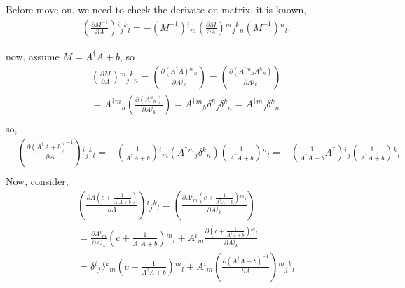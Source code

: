 \begin{tcolorbox}
Before move on, we need to check the derivate on matrix, it is known, 
\begin{equation}
\begin{split}
&\left(\frac{\partial M^{-1}}{\partial A}\right){}^i{}_j{}^k{}_l= -(M^{-1}){}^i{}_m \left(\frac{\partial M}{\partial A}\right){}^m{}_j{}^k{}_n (M^{-1}){}^n{}_l.
\end{split}
\end{equation}

now, assume $M=A^{\dagger}A+b$, so
\begin{equation}
\begin{split}
&\left(\frac{\partial M}{\partial A}\right){}^m{}_j{}^k{}_n = \left(\frac{\partial (A^{\dagger}A){}^m{}_n}{\partial A {}^j{}_k}\right)= \left(\frac{\partial (A^{\dagger}{}^m{}_h A{}^h{}_n)}{\partial A {}^j{}_k}\right)\\
&= A^{\dagger}{}^m{}_h \left(\frac{\partial ( A{}^h{}_n)}{\partial A {}^j{}_k}\right)= A^{\dagger}{}^m{}_h \delta {}^h{}_j \delta {}^k {}_n = A^{\dagger}{}^m{}_j \delta {}^k {}_n\\
\end{split}
\end{equation}
so,
\begin{equation}
\begin{split}
&\left(\frac{\partial \left(A^{\dagger}A+b\right)^{-1}}{\partial A}\right){}^i{}_j{}^k{}_l= -\left(\frac{1}{A^{\dagger}A+b}\right){}^i{}_m \left(A^{\dagger}{}^m{}_j \delta {}^k {}_n\right) \left(\frac{1}{A^{\dagger}A+b}\right){}^n{}_l
 =-\left(\frac{1}{A^{\dagger}A+b}A^{\dagger}\right){}^i{}_j  \left(\frac{1}{A^{\dagger}A+b}\right){}^k{}_l\\
\end{split}
\end{equation}
Now, consider,
\begin{equation}
\begin{split}
&\left(\frac{\partial A\left(c+\frac{1}{A^{\dagger}A+b}\right)}{\partial A}\right){}^i{}_j{}^k{}_l= \left(\frac{\partial A{}^i{}_m\left(c+\frac{1}{A^{\dagger}A+b}\right){}^m{}_l}{\partial A{}^j{}_k}\right)\\
&=\frac{\partial A{}^i{}_m}{\partial A{}^j{}_k}\left(c+\frac{1}{A^{\dagger}A+b}\right){}^m{}_l + A{}^i{}_m\frac{\partial \left(c+\frac{1}{A^{\dagger}A+b}\right){}^m{}_l}{\partial A{}^j{}_k}\\
&=\delta {}^i{}_j \delta {}^k{}_m \left(c+\frac{1}{A^{\dagger}A+b}\right){}^m{}_l+ A{}^i{}_m\left(\frac{\partial \left(A^{\dagger}A+b\right)^{-1}}{\partial A}\right){}^m{}_j{}^k{}_l\\

\end{split}
\end{equation}
\end{tcolorbox}
